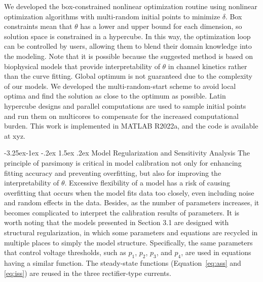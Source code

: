 \documentclass[11pt]{article}
\makeatletter
\renewcommand\subsection{\@startsection{subsection}{2}{\z@}%
                                     {-3.25ex\@plus -1ex \@minus -.2ex}%
                                     {1.5ex \@plus .2ex}%
                                     {\normalfont\fontfamily{phv}\fontsize{14}{17}\bfseries}}
\makeatother
\begin{document}
We developed the box-constrained nonlinear optimization routine using nonlinear optimization algorithms with multi-random initial points to minimize $\delta$. Box constraints mean that $\theta$ has a lower and upper bound for each dimension, so solution space is constrained in a hypercube. In this way, the optimization loop can be controlled by users, allowing them to blend their domain knowledge into the modeling. Note that it is possible because the suggested method is based on biophysical models that provide interpretability of $\theta$ in channel kinetics rather than the curve fitting. Global optimum is not guaranteed due to the complexity of our models. We developed the multi-random-start scheme to avoid local optima and find the solution as close to the optimum as possible. Latin hypercube designs and parallel computations are used to sample initial points and run them on multicores to compensate for the increased computational burden. This work is implemented in MATLAB R2022a, and the code is available at xyz.

\subsection{Model Regularization and Sensitivity Analysis}
The principle of parsimony is critical in model calibration not only for enhancing fitting accuracy and preventing overfitting, but also for improving the interpretability of $\theta$. Excessive flexibility of a model has a risk of causing overfitting that occurs when the model fits data too closely, even including noise and random effects in the data. Besides, as the number of parameters increases, it becomes complicated to interpret the calibration results of parameters. It is worth noting that the models presented in Section 3.1 are designed with structural regularization, in which some parameters and equations are recycled in multiple places to simply the model structure. Specifically, the same parameters that control voltage thresholds, such as $p_{1}$, $p_{2}$, $p_{3}$, and $p_{4}$, are used in equations having a similar function. The steady-state functions (Equation~\ref{eq:ass} and \ref{eq:iss}) are reused in the three rectifier-type currents. 
\end{document}
